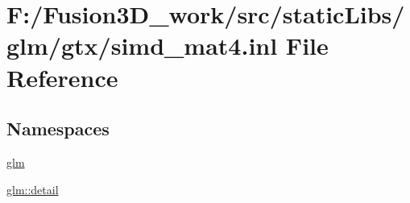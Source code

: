 \hypertarget{simd__mat4_8inl}{}\section{F\+:/\+Fusion3\+D\+\_\+work/src/static\+Libs/glm/gtx/simd\+\_\+mat4.inl File Reference}
\label{simd__mat4_8inl}
\subsection*{Namespaces}
\begin{DoxyCompactItemize}
\item 
 \hyperlink{namespaceglm}{glm}
\item 
 \hyperlink{namespaceglm_1_1detail}{glm\+::detail}
\end{DoxyCompactItemize}
